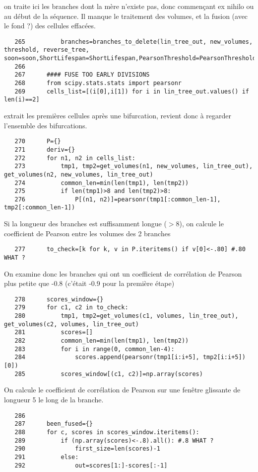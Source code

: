 \documentclass{article}
\def \mycolor {red}
\begin{document}
\color{\mycolor}
on traite ici les branches dont la m\`ere n'existe pas, donc commen\c{c}ant ex nihilo ou au d\'ebut de la s\'equence. Il manque le traitement des volumes, et la fusion (avec le fond ?) des cellules effac\'ees.
\color{black}
\begin{verbatim}
   265	        branches=branches_to_delete(lin_tree_out, new_volumes, threshold, reverse_tree, soon=soon,ShortLifespan=ShortLifespan,PearsonThreshold=PearsonThreshold,time_begin=time_begin,time_end=time_end)
   266	
   267	    #### FUSE TOO EARLY DIVISIONS
   268	    from scipy.stats.stats import pearsonr
   269	    cells_list=[(i[0],i[1]) for i in lin_tree_out.values() if len(i)==2]
\end{verbatim} 
\color{\mycolor}
extrait les premi\`eres cellules apr\`es une bifurcation, revient donc \`a regarder l'ensemble des bifurcations.
\color{black}
\begin{verbatim}
   270	    P={}
   271	    deriv={}
   272	    for n1, n2 in cells_list:
   273	        tmp1, tmp2=get_volumes(n1, new_volumes, lin_tree_out), get_volumes(n2, new_volumes, lin_tree_out)
   274	        common_len=min(len(tmp1), len(tmp2))
   275	        if len(tmp1)>8 and len(tmp2)>8: 
   276	            P[(n1, n2)]=pearsonr(tmp1[:common_len-1], tmp2[:common_len-1])
\end{verbatim} 
\color{\mycolor}
Si la longueur des branches est suffisamment longue ($>8$), on calcule le coefficient de Pearson entre les volumes des 2 branches 
\color{black}
\begin{verbatim}
   277	    to_check=[k for k, v in P.iteritems() if v[0]<-.80] #.80 WHAT ? 
\end{verbatim} 
\color{\mycolor}
On examine donc les branches qui ont un coefficient de corr\'elation de Pearson plus petite que -0.8 (c'\'etait -0.9 pour la premi\`ere \'etape)
\color{black}
\begin{verbatim}
   278	    scores_window={}
   279	    for c1, c2 in to_check:
   280	        tmp1, tmp2=get_volumes(c1, volumes, lin_tree_out), get_volumes(c2, volumes, lin_tree_out)
   281	        scores=[]
   282	        common_len=min(len(tmp1), len(tmp2))
   283	        for i in range(0, common_len-4):
   284	            scores.append(pearsonr(tmp1[i:i+5], tmp2[i:i+5])[0])
   285	        scores_window[(c1, c2)]=np.array(scores)
\end{verbatim} 
\color{\mycolor}
On calcule le coefficient de corr\'elation de Pearson sur une fen\^etre glissante de longueur 5 le long de la branche.
\color{black}
\begin{verbatim}
   286	
   287	    been_fused={}
   288	    for c, scores in scores_window.iteritems():
   289	        if (np.array(scores)<-.8).all(): #.8 WHAT ? 
   290	            first_size=len(scores)-1
   291	        else:
   292	            out=scores[1:]-scores[:-1]
\end{verbatim} 
\end{document}
